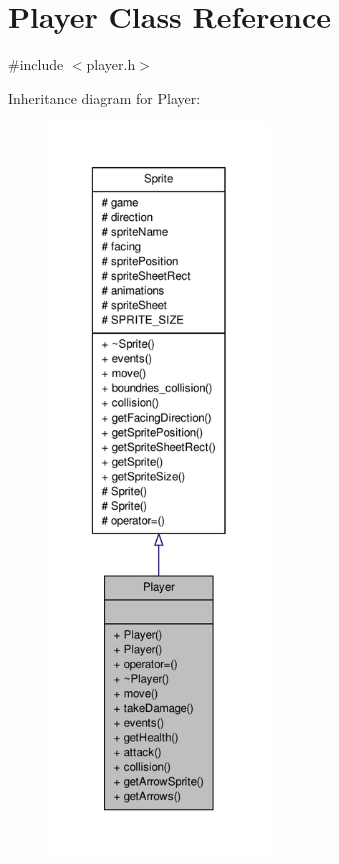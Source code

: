 \hypertarget{classPlayer}{\section{Player Class Reference}
\label{classPlayer}
}


{\ttfamily \#include $<$player.\-h$>$}



Inheritance diagram for Player\-:\nopagebreak
\begin{figure}[H]
\begin{center}
\leavevmode
\includegraphics[height=550pt]{classPlayer__inherit__graph}
\end{center}
\end{figure}


